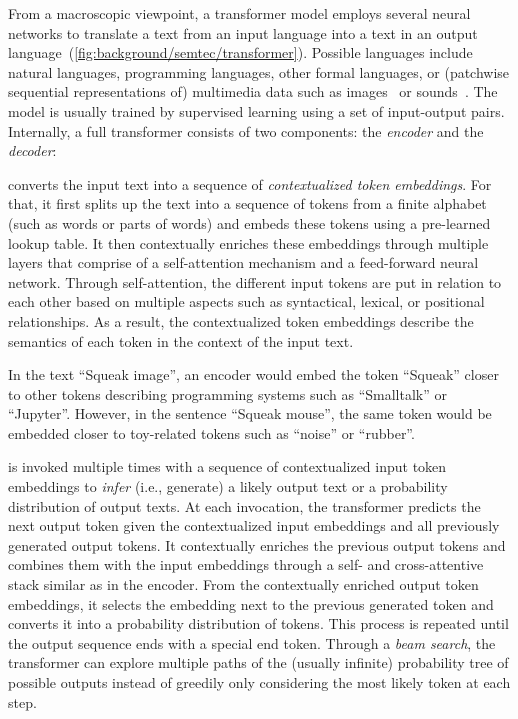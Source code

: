 From a macroscopic viewpoint, a transformer model employs several neural networks to translate a text from an input language into a text in an output language~(\cref{fig:background/semtec/transformer}).
Possible languages include natural languages, programming languages, other formal languages, or (patchwise sequential representations of) multimedia data such as images~\cite{dosovitskiy2021image} or sounds~\cite{gong2021ast}.
The model is usually trained by supervised learning using a set of input-output pairs.
Internally, a full transformer consists of two components: the \emph{encoder} and the \emph{decoder}:
%
\begin{description}[noextralabelsep]
	\item[The encoder] converts the input text into a sequence of \emph{contextualized token embeddings}.
	For that, it first splits up the text into a sequence of tokens from a finite alphabet (such as words or parts of words) and embeds these tokens using a pre-learned lookup table.
	It then contextually enriches these embeddings through multiple layers that comprise of a self-attention mechanism and a feed-forward neural network.
	Through self-attention, the different input tokens are put in relation to each other based on multiple aspects such as syntactical, lexical, or positional relationships.
	As a result, the contextualized token embeddings describe the semantics of each token in the context of the input text.

	\begin{example}
		In the text ``Squeak image'', an encoder would embed the token ``Squeak'' closer to other tokens describing programming systems such as ``Smalltalk'' or ``Jupyter''.
		However, in the sentence ``Squeak mouse'', the same token would be embedded closer to toy-related tokens such as ``noise'' or ``rubber''.
	\end{example}

	\item[The decoder] is invoked multiple times with a sequence of contextualized input token embeddings to \emph{infer} (i.e., generate) a likely output text or a probability distribution of output texts.
	At each invocation, the transformer predicts the next output token given the contextualized input embeddings and all previously generated output tokens.
	It contextually enriches the previous output tokens and combines them with the input embeddings through a self- and cross-attentive stack similar as in the encoder.
	From the contextually enriched output token embeddings, it selects the embedding next to the previous generated token and converts it into a probability distribution of tokens.
	This process is repeated until the output sequence ends with a special end token.
	Through a \emph{beam search}, the transformer can explore multiple paths of the (usually infinite) probability tree of possible outputs instead of greedily only considering the most likely token at each step.


\end{description}

